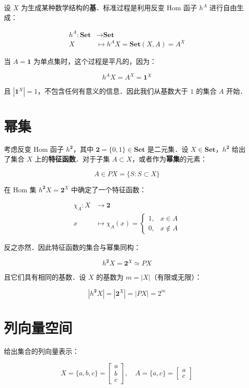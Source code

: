 \documentclass[10pt, openany]{book}
\begin{document}
设 $X$ 为生成某种数学结构的\textbf{基}．标准过程是利用反变 Hom 函子 $h^A$ 进行自由生成：

$$
\begin{aligned}
h^A: \textbf{Set} &\to \textbf{Set} \\
X &\mapsto h^A X = \textbf{Set}(X,A) = A^X
\end{aligned}
$$

当 $A = \mathbf{1}$ 为单点集时，这个过程是平凡的，因为：

$$
h^A X = A^X = \mathbf{1}^X
$$

且 $|\mathbf{1}^X| = 1$，不包含任何有意义的信息．因此我们从基数大于 $1$ 的集合 $A$ 开始．

\section{幂集}

考虑反变 Hom 函子 $h^{\mathbf{2}}$，其中 $\mathbf{2} = \{0,1\} \in \textbf{Set}$ 是二元集．设 $X \in \textbf{Set}$，$h^{\mathbf{2}}$ 给出了集合 $X$ 上的\textbf{特征函数}．对于子集 $A \subset X$，或者作为\textbf{幂集}的元素：

$$
A \in PX = \{ S: S \subset X \}
$$

在 Hom 集 $h^{\mathbf{2}} X = \mathbf{2}^X$ 中确定了一个特征函数：

$$
\begin{aligned}
\chi_A: X &\to \mathbf{2} \\
x &\mapsto \chi_A(x) = \begin{cases} 1, & x \in A \\ 0, & x \notin A \end{cases}
\end{aligned}
$$

反之亦然．因此特征函数的集合与幂集同构：

$$
h^{\mathbf{2}} X = \mathbf{2}^X \simeq PX
$$

且它们具有相同的基数．设 $X$ 的基数为 $m = |X|$（有限或无限）：

$$
|h^{\mathbf{2}} X| = |\mathbf{2}^X| = |PX| = 2^m
$$

\section{列向量空间}

给出集合的列向量表示：

$$
X = \{a,b,c\} = \begin{bmatrix}a\\b\\c\end{bmatrix},\quad 
A = \{a,c\} = \begin{bmatrix}a\\c\end{bmatrix}
$$
\end{document}

